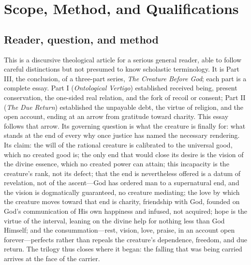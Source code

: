 \section{Scope, Method, and Qualifications}

\subsection{Reader, question, and method}

This is a discursive theological article for a serious general reader, able to follow careful distinctions but not presumed to know scholastic terminology. It is Part III, the conclusion, of a three-part series, \emph{The Creature Before God}; each part is a complete essay. Part I (\emph{Ontological Vertigo}) established received being, present conservation, the one-sided real relation, and the fork of recoil or consent; Part II (\emph{The Due Return}) established the unpayable debt, the virtue of religion, and the open account, ending at an arrow from gratitude toward charity. This essay follows that arrow. Its governing question is what the creature is finally for: what stands at the end of every why once justice has named the necessary rendering. Its claim: the will of the rational creature is calibrated to the universal good, which no created good is; the only end that would close its desire is the vision of the divine essence, which no created power can attain; this incapacity is the creature's rank, not its defect; that the end is nevertheless offered is a datum of revelation, not of the ascent---God has ordered man to a supernatural end, and the vision is dogmatically guaranteed, no creature mediating; the love by which the creature moves toward that end is charity, friendship with God, founded on God's communication of His own happiness and infused, not acquired; hope is the virtue of the interval, leaning on the divine help for nothing less than God Himself; and the consummation---rest, vision, love, praise, in an account open forever---perfects rather than repeals the creature's dependence, freedom, and due return. The trilogy thus closes where it began: the falling that was being carried arrives at the face of the carrier.

